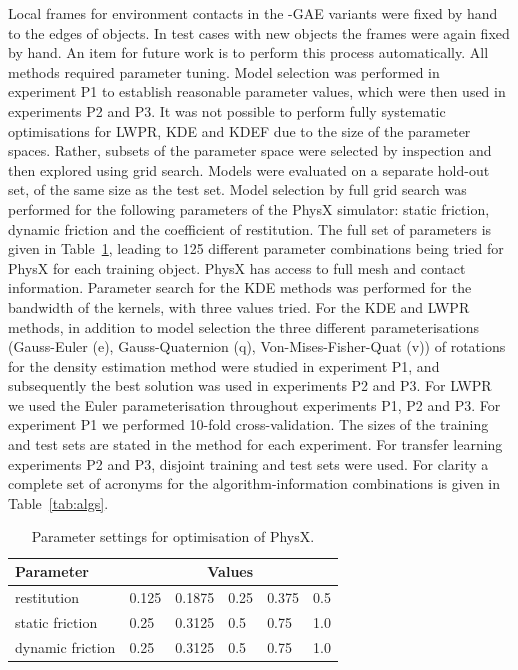 Local frames for environment contacts in the -GAE variants were fixed
by hand to the edges of objects. In test cases with new objects the
frames were again fixed by hand.  An item for future work is to
perform this process automatically.  All methods required parameter tuning. Model selection was performed in experiment P1 to establish reasonable parameter values, which were then used in experiments P2 and P3.  It was not possible to perform fully systematic optimisations for LWPR, KDE and KDEF due to the size of the parameter spaces.  Rather, subsets of the parameter space were selected by inspection and then explored using grid search.  Models were evaluated on a separate hold-out set, of the same size as the test set. Model selection by full grid search was performed for the following parameters of the PhysX simulator: static friction, dynamic friction and the coefficient of restitution. The full set of parameters is given in Table~\ref{tab:physx}, leading to 125 different parameter combinations being tried for PhysX for each training object. PhysX has access to full mesh and contact information. Parameter search for the KDE methods was performed for the bandwidth of the kernels, with three values tried. For the KDE and LWPR methods, in addition to model selection the three different parameterisations (Gauss-Euler (e), Gauss-Quaternion (q), Von-Mises-Fisher-Quat (v)) of rotations for the density estimation method were studied in experiment P1, and subsequently the best solution was used in experiments P2 and P3. For LWPR we used the Euler parameterisation throughout experiments P1, P2 and P3. For experiment P1 we performed 10-fold cross-validation. The sizes of the training and test sets are stated in the method for each experiment. For transfer learning experiments P2 and P3, disjoint training and test sets were used. For clarity a complete set of acronyms for the algorithm-information combinations is given in Table~\ref{tab:algs}. 
\begin{table}[b]
\begin{center}
\begin{tabular}{|l|l|l|l|l|l|}\hline
Parameter & \multicolumn{5}{|c|}{Values} \\ \hline
restitution & 0.125 & 0.1875 & 0.25 &  0.375 & 0.5\\ \hline
static friction & 0.25 & 0.3125 & 0.5 & 0.75 & 1.0  \\ \hline
dynamic friction & 0.25 & 0.3125 & 0.5 & 0.75 & 1.0\\ \hline
\end{tabular}
\caption{Parameter settings for optimisation of PhysX. \label{tab:physx}}
\end{center}
\end{table}

